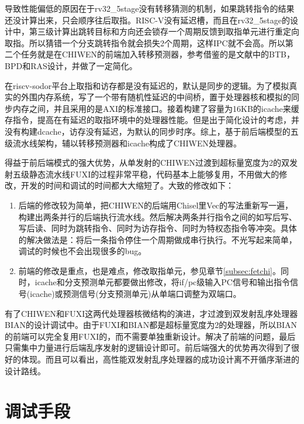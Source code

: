 导致性能偏低的原因在于rv32\_5stage没有转移猜测的机制，如果跳转指令的结果还没计算出来，只会顺序往后取指。RISC-V没有延迟槽，而且在rv32\_5stage的设计中，第三级计算出跳转目标和方向还会锁存一个周期反馈到取指单元进行重定向取指。所以猜错一个分支跳转指令就会损失2个周期，这样IPC就不会高。所以第二个任务就是在CHIWEN的前端加入转移预测器，参考借鉴的是文献\citet{Celio:EECS-2017-157}中的BTB，BPD和RAS设计，并做了一定简化。

在riscv-sodor平台上取指和访存都是没有延迟的，默认是同步的逻辑。为了模拟真实的外围内存系统，写了一个带有随机性延迟的中间桥，置于处理器核和模拟的同步内存之间，并且采用的是AXI的标准接口。接着构建了容量为16KB的icache来缓存指令，提高在有延迟的取指环境中的处理器性能。但是出于简化设计的考虑，并没有构建dcache，访存没有延迟，为默认的同步时序。综上，基于前后端模型的五级流水线架构，辅以转移预测器和icache构成了CHIWEN处理器。

得益于前后端模式的强大优势，从单发射的CHIWEN过渡到超标量宽度为2的双发射五级静态流水线FUXI的过程非常平稳，代码基本上能够复用，不用做大的修改，开发的时间和调试的时间都大大缩短了。大致的修改如下：
\begin{enumerate}[label=(\alph*)]
	\item 后端的修改较为简单，把CHIWEN的后端用Chisel里Vec的写法重新写一遍，构建出两条并行的后端执行流水线。然后解决两条并行指令之间的如写后写、写后读、同时为跳转指令、同时为访存指令、同时为特权态指令等冲突。具体的解决做法是：将后一条指令停住一个周期做成串行执行。不光写起来简单，调试的时候也不会出现很多的bug。
	\item 前端的修改是重点，也是难点，修改取指单元，参见章节\ref{subsec:fetchi}。同时，icache和分支预测单元都要做出修改，将if/pc级输入PC信号和输出指令信号(icache)或预测信号(分支预测单元)从单端口调整为双端口。
\end{enumerate}

有了CHIWEN和FUXI这两代处理器核微结构的演进，才过渡到双发射乱序处理器BIAN的设计调试中。由于FUXI和BIAN都是超标量宽度为2的处理器，所以BIAN的前端可以完全复用FUXI的，而不需要单独重新设计。解决了前端的问题，最后只需集中力量进行后端乱序发射的逻辑设计即可。前后端强大的优势再次得到了很好的体现。而且可以看出，高性能双发射乱序处理器的成功设计离不开循序渐进的设计路线。

\section{调试手段}

